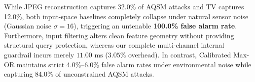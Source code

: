 \documentclass[preprint,12pt]{elsarticle}
\begin{document}
\begin{table}[!htbp]
\centering
\caption{Empirical evaluation of input-space anomaly baselines vs. proposed RT-DETR structural guardrails across clean data, adversarial attacks ($\epsilon=16/255$), and harsh environmental corruptions ($N=25$).}
\label{tab:defensive_baselines}
\renewcommand{\arraystretch}{1.40}
\end{table}

While JPEG reconstruction captures 32.0\% of AQSM attacks and TV captures 12.0\%, both input-space baselines completely collapse under natural sensor noise (Gaussian noise $\sigma=16$), triggering an untenable \textbf{100.0\% false alarm rate}. Furthermore, input filtering alters clean feature geometry without providing structural query protection, whereas our complete multi-channel internal guardrail incurs merely $11.00\text{ ms}$ ($3.05\%$ overhead). In contrast, Calibrated Max-OR maintains strict 4.0\%--6.0\% false alarm rates under environmental noise while capturing 84.0\% of unconstrained AQSM attacks.
\end{document}
